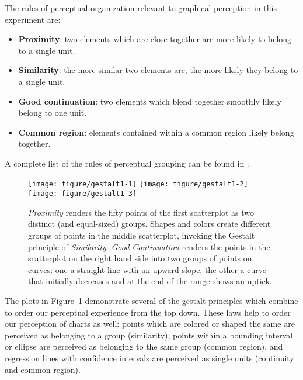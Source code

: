 \documentclass[12pt]{article}\usepackage[]{graphicx}\usepackage[]{color}
\newenvironment{knitrout}{}{} %
\begin{document}
The rules of perceptual organization relevant to graphical perception in this experiment are:
\begin{itemize}
\item \textbf{Proximity}: two elements which are close together are more likely to belong to a single unit.
\item \textbf{Similarity}: the more similar two elements are, the more likely they belong to a single unit.
\item \textbf{Good continuation}: two elements which blend together smoothly likely belong to one unit.
\item \textbf{Common region}: elements contained within a common region likely belong together. 
\end{itemize}
A complete list of the rules of perceptual grouping can be found in \citet{goldstein2009encyclopedia}.


\begin{figure}\centering
\begin{knitrout}
\color{fgcolor}

{\centering \texttt{[image: figure/gestalt1-1]} 
\texttt{[image: figure/gestalt1-2]} 
\texttt{[image: figure/gestalt1-3]} 

}



\end{knitrout}
\caption[Gestalt principles applied to statistical plots]{\label{fig:gestalt} \emph{Proximity} renders the fifty points of the first scatterplot as two distinct (and equal-sized) groups. Shapes and colors create different groups of points in the middle scatterplot, invoking the Gestalt principle of \emph{Similarity}. \emph{Good Continuation} renders the points in the scatterplot on the right hand side into two groups of points on curves: one a straight line with an upward slope, the other a curve that initially decreases and at the end of the range shows an uptick.} 
\end{figure}

The plots in Figure~\ref{fig:gestalt} demonstrate several of the gestalt principles which combine to order our perceptual experience from the top down. These laws help to order our perception of charts as well: points which are colored or shaped the same are perceived as belonging to a group (similarity), points within a bounding interval or ellipse are perceived as belonging to the same group (common region), and regression lines with confidence intervals are perceived as single units (continuity and common region). 
\end{document}
